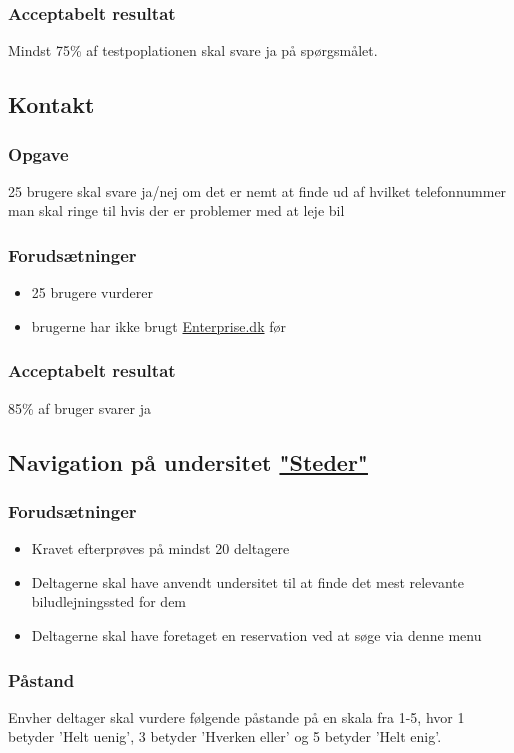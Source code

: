 \documentclass[a4paper,10pt]{article}
\begin{document}
\subsubsection{Acceptabelt resultat}
Mindst 75\% af testpoplationen skal svare ja på spørgsmålet.

\subsection{Kontakt}
\subsubsection{Opgave}
25 brugere skal svare ja/nej om det er nemt at finde ud af hvilket telefonnummer man skal ringe til hvis der er problemer med at leje bil
\subsubsection{Forudsætninger}
\begin{itemize}
    \item{25 brugere vurderer}
    \item  brugerne har ikke brugt \href{http://Enterprise.dk}{Enterprise.dk} før
\end{itemize}
\subsubsection{Acceptabelt resultat}
85\% af bruger svarer ja

\subsection{Navigation på undersitet \href{https://www.enterprise.dk/da_DK/car-rental/locations.html}{"Steder"}}
\subsubsection{Forudsætninger}
\begin{itemize}
	\item Kravet efterprøves på mindst 20 deltagere
	\item Deltagerne skal have anvendt undersitet til at finde det mest relevante biludlejningssted for dem
	\item Deltagerne skal have foretaget en reservation ved at søge via denne menu
\end{itemize}
\subsubsection{Påstand}
Envher deltager skal vurdere følgende påstande på en skala fra 1-5, hvor 1 betyder 'Helt uenig', 3 betyder 'Hverken eller' og 5 betyder 'Helt enig'. 
\end{document}
